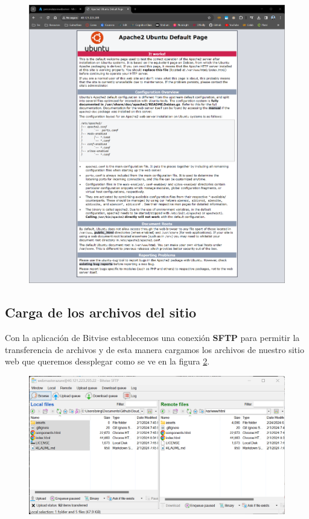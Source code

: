 \documentclass[12pt,a4paper]{article}
\begin{document}
\begin{figure}[H]
    \centering
    \includegraphics[width=1\linewidth]{M4_Servicios_Cómputo_en_la_Nube/Tarea_5_Creación_Máquinas_Virtuales_en_Nube/reporte/figuras/1_3_1_Configuración_Pública.png}
    \label{fig:Azure_6}
\end{figure}

\subsection{Carga de los archivos del sitio}

Con la aplicación de Bitvise establecemos una conexión \textbf{SFTP} para permitir la transferencia de archivos y de esta manera cargamos los archivos de nuestro sitio web que queremos dessplegar como se ve en la figura \ref{fig:Azure_7}.

\begin{figure}[H]
    \centering
    \includegraphics[width=1\linewidth]{M4_Servicios_Cómputo_en_la_Nube/Tarea_5_Creación_Máquinas_Virtuales_en_Nube/reporte/figuras/1_4_1_Carga_archivos.png}
    \label{fig:Azure_7}
\end{figure}
\end{document}
